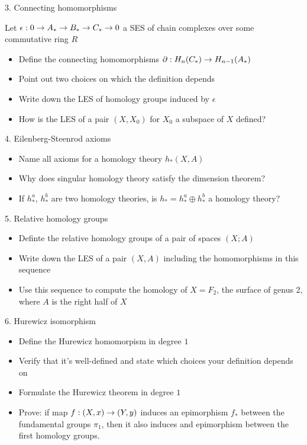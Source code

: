3. Connecting homomorphisms

Let $\epsilon: 0\rightarrow A_* \rightarrow B_* \rightarrow C_* \rightarrow 0$ a SES of chain complexes over some commutative ring $R$

\begin{itemize}
    \item Define the connecting homomorphisms $\partial :H_n(C_*)\rightarrow H_{n-1}(A_*)$
    \item Point out two choices on which the definition depends
    \item Write down the LES of homology groups induced by $\epsilon$
    \item How is the LES of a pair $(X,X_0)$ for $X_0$ a subspace of $X$ defined?
\end{itemize}

4. Eilenberg-Steenrod axioms

\begin{itemize}
    \item Name all axioms for a homology theory $h_*(X,A)$
    \item Why does singular homology theory satisfy the dimension theorem?
    \item If $h_*^a$, $h_*^b$ are two homology theories, is $h_*=h^a_*\oplus h^b_*$ a homology theory?
\end{itemize}

5. Relative homology groups

\begin{itemize}
    \item Definte the relative homology groups of a pair of spaces $(X;A)$ 
    \item Write down the LES of a pair $(X,A)$ including the homomorphisms in this sequence
    \item Use this sequence to compute the homology of $X=F_2$, the surface of genus 2, where $A$ is the right half of $X$
\end{itemize}

6. Hurewicz isomorphism

\begin{itemize}
    \item Define the Hurewicz homomorpism in degree $1$
    \item Verify that it's well-defined and state which choices your definition depends on
    \item Formulate the Hurewicz theorem in degree $1$
    \item Prove: if map $f:(X,x)\rightarrow (Y,y)$ induces an epimorphism $f_*$ between the fundamental groups $\pi_1$, then it also induces and epimorphism between the first homology groups. 
\end{itemize}

